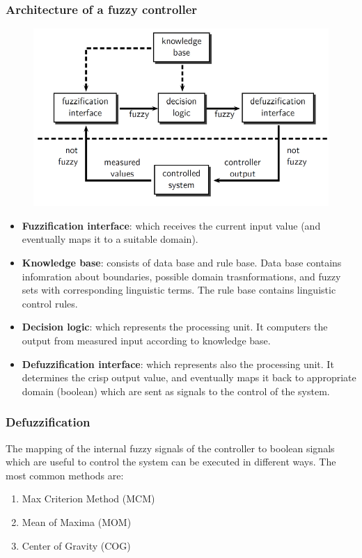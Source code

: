 \documentclass{article}
\begin{document}
\subsubsection{Architecture of a fuzzy controller}
\begin{figure}[h]
    \centering
    \includegraphics[scale=0.5]{images/fuzzy-controller.png}
\end{figure}
\begin{itemize}
    \item \textbf{Fuzzification interface}: which receives the current input value (and
          eventually maps it to a suitable domain).
    \item \textbf{Knowledge base}: consists of data base and rule base. Data base contains
          infomration about boundaries, possible domain trasnformations, and fuzzy sets with corresponding linguistic
          terms. The rule base contains linguistic control rules.
    \item \textbf{Decision logic}: which represents the processing unit. It computers the output
          from measured input according to knowledge base.
    \item \textbf{Defuzzification interface}: which represents also the processing unit. It determines
          the crisp output value, and eventually maps it back to appropriate domain (boolean) which are sent as
          signals to the control of the system.
\end{itemize}

\subsubsection{Defuzzification}
The mapping of the internal fuzzy signals of the controller to boolean signals which are useful
to control the system can be executed in different ways. The most common methods are:
\begin{enumerate}
    \item Max Criterion Method (MCM)
    \item Mean of Maxima (MOM)
    \item Center of Gravity (COG)
\end{enumerate}
\end{document}
